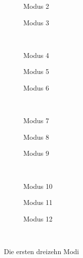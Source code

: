 \documentclass[]{report}
\begin{document}
\begin{enumerate}
\begin{enumerate}
\begin{figure}[tbp!]
\begin{subfigure}{0.3\textwidth}
					\centering
					
					\caption{Modus 2}
					\label{fig:mode2}
				\end{subfigure}	
				\quad
				\begin{subfigure}{0.3\textwidth}
					\centering
					
					\caption{Modus 3}
					\label{fig:mode3}
				\end{subfigure}	
				\\
				\begin{subfigure}{0.3\textwidth}
					\centering
					
					\caption{Modus 4}
					\label{fig:mode4}
				\end{subfigure}
				\quad
				\begin{subfigure}{0.3\textwidth}
					\centering
					
					\caption{Modus 5}
					\label{fig:mode5}
				\end{subfigure}	
				\quad
				\begin{subfigure}{0.3\textwidth}
					\centering
					
					\caption{Modus 6}
					\label{fig:mode6}
				\end{subfigure}	
				\\
				\begin{subfigure}{0.3\textwidth}
					\centering
					
					\caption{Modus 7}
					\label{fig:mode7}
				\end{subfigure}
				\quad
				\begin{subfigure}{0.3\textwidth}
					\centering
					
					\caption{Modus 8}
					\label{fig:mode8}
				\end{subfigure}	
				\quad
				\begin{subfigure}{0.3\textwidth}
					\centering
					
					\caption{Modus 9}
					\label{fig:mode9}
				\end{subfigure}	
				\\
				\begin{subfigure}{0.3\textwidth}
					\centering
					
					\caption{Modus 10}
					\label{fig:mode10}
				\end{subfigure}
				\quad
				\begin{subfigure}{0.3\textwidth}
					\centering
					
					\caption{Modus 11}
					\label{fig:mode11}
				\end{subfigure}	
				\quad
				\begin{subfigure}{0.3\textwidth}
					\centering
					
					\caption{Modus 12}
					\label{fig:mode12}
				\end{subfigure}	
				\\
				\caption{Die ersten dreizehn Modi}
				\label{fig:modi}
			\end{figure}
			

\end{enumerate}
\end{enumerate}
\end{document}
